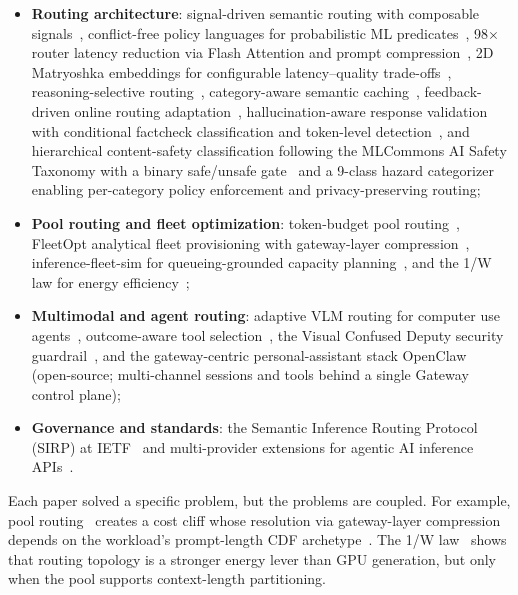 \begin{itemize}[nosep]
  \item \textbf{Routing architecture}: signal-driven semantic routing
        with composable signals~\cite{vllmsr2026}, conflict-free
        policy languages for probabilistic ML
        predicates~\cite{probpol2026}, 98$\times$ router latency
        reduction via Flash Attention and prompt
        compression~\cite{fastrouter2026}, 2D Matryoshka embeddings
        for configurable latency--quality
        trade-offs~\cite{mmberted2025}, reasoning-selective
        routing~\cite{wang2025reason}, category-aware semantic
        caching~\cite{wang2025cache}, feedback-driven online
        routing adaptation~\cite{feedbackdet2026},
        hallucination-aware response validation with conditional
        factcheck classification and token-level
        detection~\cite{halugate2025, factcheck2026}, and
        hierarchical content-safety classification following the
        MLCommons AI Safety Taxonomy with a binary safe/unsafe
        gate~\cite{safetyl1_2026} and a 9-class hazard
        categorizer~\cite{safetyl2_2026} enabling per-category policy
        enforcement and privacy-preserving routing;
  \item \textbf{Pool routing and fleet optimization}: token-budget pool
        routing~\cite{poolrouting2026}, FleetOpt analytical fleet
        provisioning with gateway-layer
        compression~\cite{fleetopt2026}, inference-fleet-sim for
        queueing-grounded capacity
        planning~\cite{fleetsim2026}, and the 1/W law for energy
        efficiency~\cite{onewlaw2026};
  \item \textbf{Multimodal and agent routing}: adaptive VLM routing for
        computer use agents~\cite{avr2026}, outcome-aware tool
        selection~\cite{oats2026}, the Visual Confused Deputy
        security guardrail~\cite{vcd2026}, and the
        gateway-centric personal-assistant stack
        OpenClaw~\cite{openclaw2026} (open-source; multi-channel
        sessions and tools behind a single Gateway control plane);
  \item \textbf{Governance and standards}: the Semantic Inference
        Routing Protocol (SIRP) at IETF~\cite{sirp2025} and
        multi-provider extensions for agentic AI inference
        APIs~\cite{mpext2025}.
\end{itemize}

Each paper solved a specific problem, but the problems are coupled.  
For example, pool routing~\cite{poolrouting2026} creates a cost
cliff whose resolution via gateway-layer compression depends on the
workload's prompt-length CDF archetype~\cite{fleetopt2026}.  The 1/W
law~\cite{onewlaw2026} shows that routing topology is a stronger
energy lever than GPU generation, but only when the pool supports
context-length partitioning.

